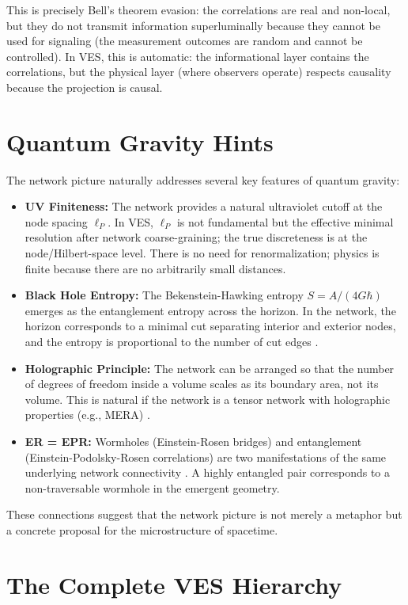 \documentclass[12pt,a4paper]{book}
\begin{document}
This is precisely Bell's theorem evasion: the correlations are real and non-local, but they do not transmit information superluminally because they cannot be used for signaling (the measurement outcomes are random and cannot be controlled). In VES, this is automatic: the informational layer contains the correlations, but the physical layer (where observers operate) respects causality because the projection is causal.

\section{Quantum Gravity Hints}

The network picture naturally addresses several key features of quantum gravity:
\begin{itemize}
    \item \textbf{UV Finiteness:} The network provides a natural ultraviolet cutoff at the node spacing $\ell_P$. In VES, $\ell_P$ is not fundamental but the effective minimal resolution after network coarse-graining; the true discreteness is at the node/Hilbert-space level. There is no need for renormalization; physics is finite because there are no arbitrarily small distances.
    \item \textbf{Black Hole Entropy:} The Bekenstein-Hawking entropy $S = A/(4G\hbar)$ emerges as the entanglement entropy across the horizon. In the network, the horizon corresponds to a minimal cut separating interior and exterior nodes, and the entropy is proportional to the number of cut edges \cite{hubeny2007covariant}.
    \item \textbf{Holographic Principle:} The network can be arranged so that the number of degrees of freedom inside a volume scales as its boundary area, not its volume. This is natural if the network is a tensor network with holographic properties (e.g., MERA) \cite{swingle2012entanglement}.
    \item \textbf{ER = EPR:} Wormholes (Einstein-Rosen bridges) and entanglement (Einstein-Podolsky-Rosen correlations) are two manifestations of the same underlying network connectivity \cite{maldacena2013cool}. A highly entangled pair corresponds to a non-traversable wormhole in the emergent geometry.
\end{itemize}
These connections suggest that the network picture is not merely a metaphor but a concrete proposal for the microstructure of spacetime.

\section{The Complete VES Hierarchy}
\end{document}
